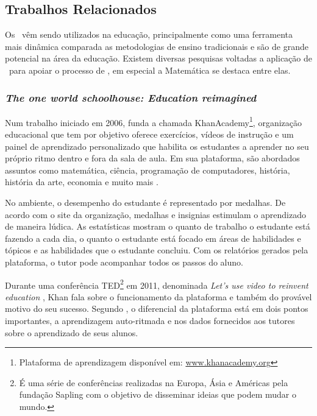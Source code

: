 \subsection{Trabalhos Relacionados}

Os \SystemsTypes~vêm sendo utilizados na educação, principalmente como uma ferramenta mais dinâmica comparada as metodologias de ensino tradicionais e são de grande potencial na área da educação. Existem diversas pesquisas voltadas a aplicação de \SystemsTypes~para apoiar o processo de \teachinglearning, em especial a Matemática se destaca entre elas.

\subsubsection{\textit{The one world schoolhouse: Education reimagined}}
Num trabalho iniciado em 2006,  funda a chamada KhanAcademy\footnote{Plataforma de aprendizagem disponível em: \url{www.khanacademy.org}}, organização educacional que tem por objetivo oferece exercícios, vídeos de instrução e um painel de aprendizado personalizado que habilita os estudantes a aprender no seu próprio ritmo dentro e fora da sala de aula. Em sua plataforma, são abordados assuntos como matemática, ciência, programação de computadores, história, história da arte, economia e muito mais \cite{khan2012one}.

No ambiente, o desempenho do estudante é representado por medalhas. De acordo com o site da organização, medalhas e insignias estimulam o aprendizado de maneira lúdica. As estatísticas mostram o quanto de trabalho o estudante está fazendo a cada dia, o quanto o estudante está focado em áreas de habilidades e tópicos e as habilidades que o estudante concluiu. Com os relatórios gerados pela plataforma, o tutor pode acompanhar todos os passos do aluno.

Durante uma conferência TED\footnote{É uma série de conferências realizadas na Europa, Ásia e Américas pela fundação Sapling com o objetivo de disseminar ideias que podem mudar o mundo.} em 2011, denominada \textit{Let's use video to reinvent education} \cite{tedtalk2011reinvend}, Khan fala sobre o funcionamento da plataforma e também do provável motivo do seu sucesso. Segundo , o diferencial da plataforma está em dois pontos importantes, a aprendizagem auto-ritmada e nos dados fornecidos aos tutores sobre o aprendizado de seus alunos. 

